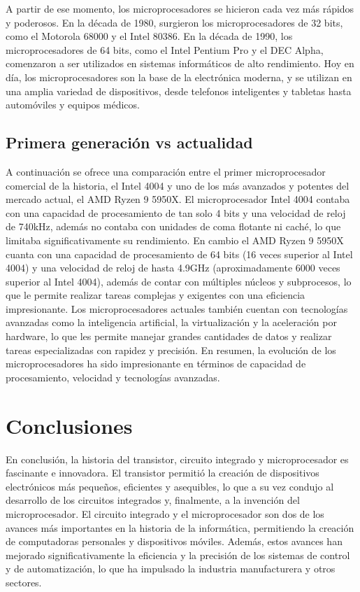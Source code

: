 \documentclass{article}
\begin{document}
A partir de ese momento, los microprocesadores se hicieron cada vez más rápidos y poderosos. En la década de 1980, surgieron los microprocesadores de 32 bits,
 como el Motorola 68000 y el Intel 80386. En la década de 1990, los microprocesadores de 64 bits, como el Intel Pentium Pro y el DEC Alpha, 
 comenzaron a ser utilizados en sistemas informáticos de alto rendimiento. Hoy en día, los microprocesadores son la base de la electrónica moderna, 
 y se utilizan en una amplia variedad de dispositivos, desde telefonos inteligentes y tabletas hasta automóviles y equipos médicos.
\subsection*{Primera generación vs actualidad}
A continuación se ofrece una comparación entre el primer microprocesador comercial de la historia, 
el Intel 4004 y uno de los más avanzados y potentes del mercado actual, el AMD Ryzen 9 5950X. 
El microprocesador Intel 4004 contaba con una capacidad de procesamiento de tan solo 4 bits y una 
velocidad de reloj de 740kHz, además no contaba con unidades de coma flotante ni caché, lo que limitaba 
significativamente su rendimiento. En cambio el AMD Ryzen 9 5950X cuanta con una capacidad de procesamiento
de 64 bits (16 veces superior al Intel 4004) y una velocidad de reloj de hasta 4.9GHz (aproximadamente 6000 veces superior 
al Intel 4004), además de contar con múltiples núcleos y subprocesos, lo que le permite realizar tareas complejas 
y exigentes con una eficiencia impresionante. Los microprocesadores actuales también cuentan con tecnologías avanzadas 
como la inteligencia artificial, la virtualización y la aceleración por hardware, lo que les permite manejar 
grandes cantidades de datos y realizar tareas especializadas con rapidez y precisión. En resumen, la evolución de 
los microprocesadores ha sido impresionante en términos de capacidad de procesamiento, velocidad y tecnologías avanzadas.


\newpage
\section*{Conclusiones}

En conclusión, la historia del transistor, circuito integrado y microprocesador es fascinante e innovadora.  
El transistor permitió la creación de dispositivos electrónicos más pequeños, eficientes y asequibles, 
lo que a su vez condujo al desarrollo de los circuitos integrados y, finalmente, a la invención del microprocesador.
El circuito integrado y el microprocesador son dos de los avances más importantes en la historia de la informática, 
permitiendo la creación de computadoras personales y dispositivos móviles. Además, estos avances han mejorado 
significativamente la eficiencia y la precisión de los sistemas de control y de automatización, lo que ha 
impulsado la industria manufacturera y otros sectores.
\end{document}
